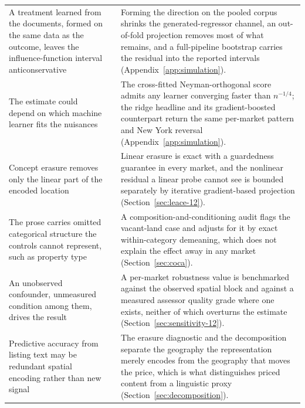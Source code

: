 \begin{table}[H]
\begin{tabular}{p{}p{}p{}}
A treatment learned from the documents, formed on the same data as the outcome,
leaves the influence-function interval anticonservative &
\citet{egami2022texts} &
Forming the direction on the pooled corpus shrinks the generated-regressor channel,
an out-of-fold projection removes most of what remains, and a full-pipeline bootstrap
carries the residual into the reported intervals (Appendix~\ref{app:simulation}). \\

The estimate could depend on which machine learner fits the nuisances &
\citet{chernozhukov2018double} &
The cross-fitted Neyman-orthogonal score admits any learner converging faster than
$n^{-1/4}$; the ridge headline and its gradient-boosted counterpart return the same
per-market pattern and New York reversal (Appendix~\ref{app:simulation}). \\

Concept erasure removes only the linear part of the encoded location &
\citet{belrose2023leace} &
Linear erasure is exact with a guardedness guarantee in every market, and the
nonlinear residual a linear probe cannot see is bounded separately by iterative
gradient-based projection (Section~\ref{sec:leace-12}). \\

The prose carries omitted categorical structure the controls cannot represent, such
as property type &
\citet{roberts2020adjusting} &
A composition-and-conditioning audit flags the vacant-land case and adjusts for it by
exact within-category demeaning, which does not explain the effect away in any market
(Section~\ref{sec:coca}). \\

An unobserved confounder, unmeasured condition among them, drives the result &
\citet{cinelli2020making} &
A per-market robustness value is benchmarked against the observed spatial block and
against a measured assessor quality grade where one exists, neither of which
overturns the estimate (Section~\ref{sec:sensitivity-12}). \\

Predictive accuracy from listing text may be redundant spatial encoding rather than
new signal &
\citet{nowak2017textual} &
The erasure diagnostic and the decomposition separate the geography the representation
merely encodes from the geography that moves the price, which is what distinguishes
priced content from a linguistic proxy (Section~\ref{sec:decomposition}). \\
\bottomrule
\end{tabular}
\end{table}
